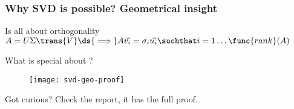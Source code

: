 \begin{frame}[plain]
	\frametitle{Why SVD is possible? Geometrical insight}
	\begin{block}{Is all about orthogonality}
    $A = U \Sigma \trans{V} \ds{\implies} A\vec{v_i} = \sigma_i
    \vec{u_i} \suchthat i=1\dots\func{rank}(A)$
	\end{block}   
	\begin{block}{What is special about ?}
    \begin{center}
      \begin{figure}[H]
        \centering
        \texttt{[image: svd-geo-proof]}
      \end{figure}
    \end{center}
	\end{block} 
	\begin{block}{Got curious?}
    Check the report, it has the full proof.
	\end{block}   
\end{frame}
